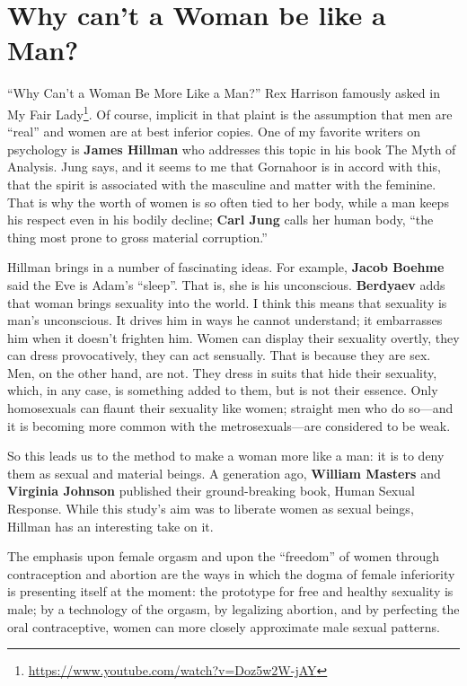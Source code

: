 \section{Why can’t a Woman be like a Man?}

``Why Can't a Woman Be More Like a Man?'' Rex Harrison famously asked in My Fair Lady\footnote{\url{https://www.youtube.com/watch?v=Doz5w2W-jAY}}. Of course, implicit in that plaint is the assumption that men are ``real'' and women are at best inferior copies. One of my favorite writers on psychology is \textbf{James Hillman} who addresses this topic in his book The Myth of Analysis. Jung says, and it seems to me that Gornahoor is in accord with this, that the spirit is associated with the masculine and matter with the feminine. That is why the worth of women is so often tied to her body, while a man keeps his respect even in his bodily decline; \textbf{Carl Jung} calls her human body, ``the thing most prone to gross material corruption.''

Hillman brings in a number of fascinating ideas. For example, \textbf{Jacob Boehme} said the Eve is Adam's ``sleep''. That is, she is his unconscious. \textbf{Berdyaev} adds that woman brings sexuality into the world. I think this means that sexuality is man's unconscious. It drives him in ways he cannot understand; it embarrasses him when it doesn't frighten him. Women can display their sexuality overtly, they can dress provocatively, they can act sensually. That is because they are sex. Men, on the other hand, are not. They dress in suits that hide their sexuality, which, in any case, is something added to them, but is not their essence. Only homosexuals can flaunt their sexuality like women; straight men who do so---and it is becoming more common with the metrosexuals---are considered to be weak.

So this leads us to the method to make a woman more like a man: it is to deny them as sexual and material beings. A generation ago, \textbf{William Masters} and \textbf{Virginia Johnson} published their ground-breaking book, Human Sexual Response. While this study's aim was to liberate women as sexual beings, Hillman has an interesting take on it.

\begin{quotex}
The emphasis upon female orgasm and upon the ``freedom'' of women through contraception and abortion are the ways in which the dogma of female inferiority is presenting itself at the moment: the prototype for free and healthy sexuality is male; by a technology of the orgasm, by legalizing abortion, and by perfecting the oral contraceptive, women can more closely approximate male sexual patterns.
\end{quotex}


